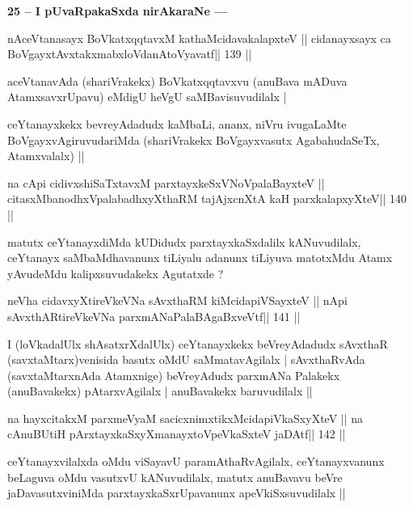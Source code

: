 \begin{artha}
{\bf 25 -- I pUvaRpakaSxda nirAkaraNe ---}
\end{artha}

\begin{shl}
nAceVtanasayx BoVkatxqqtavxM kathaMcidavakalapxteV ||
cidanayxsayx ca BoVgayxtAvxtakxmabxloVdanAtoVyavatf\hfill || 139 ||
\end{shl}

\begin{artha}
aceVtanavAda (shariVrakekx) BoVkatxqqtavxvu (anuBava mADuva AtamxsavxrUpavu) eMdigU heVgU saMBavisuvudilalx |

ceYtanayxkekx bevreyAdadudx kaMbaLi, ananx, niVru ivugaLaMte BoVgayxvAgiruvudariMda (shariVrakekx BoVgayxvasutx AgabahudaSeTx, Atamxvalalx) ||
\end{artha}

\begin{shl}
na cApi cidivxshiSaTxtavxM parxtayxkeSxVNoVpalaBayxteV ||
citasxMbanodhxVpalabadhxyXthaRM tajAjxcnXtA kaH parxkalapxyXteV\hfill || 140 ||
\end{shl}

\begin{artha}
matutx ceYtanayxdiMda kUDidudx parxtayxkaSxdalilx kANuvudilalx, ceYtanayx saMbaMdhavanunx tiLiyalu adanunx tiLiyuva matotxMdu Atamx yAvudeMdu kalipxsuvudakekx Agutatxde ? 
\end{artha}

\begin{shl}
neVha cidavxyXtireVkeVNa sAvxthaRM kiMcidapiVSayxteV ||
nApi sAvxthARtireVkeVNa parxmANaPalaBAgaBxveVtf\hfill || 141 ||
\end{shl}

\begin{artha}
I (loVkadalUlx shAsatxrXdalUlx) ceYtanayxkekx beVreyAdadudx sAvxthaR (savxtaMtarx)venisida basutx oMdU saMmatavAgilalx | sAvxthaRvAda (savxtaMtarxnAda Atamxnige) beVreyAdudx parxmANa Palakekx (anuBavakekx) pAtarxvAgilalx | anuBavakekx baruvudilalx ||
\end{artha}

\begin{shl}
na hayxcitakxM parxmeVyaM sacicxnimxtikxMcidapiVkaSxyXteV ||
na cAnuBUtiH pArxtayxkaSxyXmanayxtoV\s peVkaSxteV jaDAtf\hfill || 142 ||
\end{shl}

\begin{artha}
ceYtanayxvilalxda oMdu viSayavU paramAthaRvAgilalx, ceYtanayxvanunx beLaguva oMdu vasutxvU kANuvudilalx, matutx anuBavavu beVre jaDavasutxviniMda parxtayxkaSxrUpavanunx apeVkiSxsuvudilalx ||
\end{artha}


